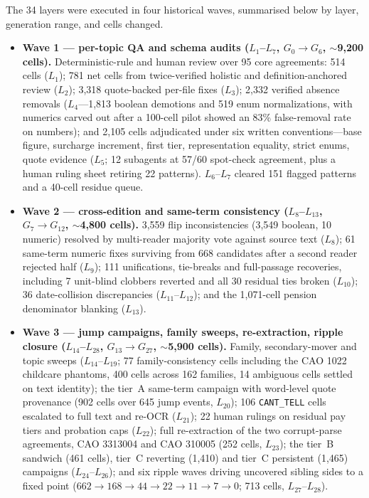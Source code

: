 The 34 layers were executed in four historical waves, summarised below by layer, generation range, and cells changed.
\begin{itemize}[leftmargin=1.5em]
  \item \textbf{Wave 1 --- per-topic QA and schema audits ($L_1$--$L_7$, $G_0 \rightarrow G_6$, $\sim$9,200 cells).} Deterministic-rule and human review over 95 core agreements: 514 cells ($L_1$); 781 net cells from twice-verified holistic and definition-anchored review ($L_2$); 3,318 quote-backed per-file fixes ($L_3$); 2,332 verified absence removals ($L_4$---1,813 boolean demotions and 519 enum normalizations, with numerics carved out after a 100-cell pilot showed an 83\% false-removal rate on numbers); and 2,105 cells adjudicated under six written conventions---base figure, surcharge increment, first tier, representation equality, strict enums, quote evidence ($L_5$; 12 subagents at 57/60 spot-check agreement, plus a human ruling sheet retiring 22 patterns). $L_6$--$L_7$ cleared 151 flagged patterns and a 40-cell residue queue.
  \item \textbf{Wave 2 --- cross-edition and same-term consistency ($L_8$--$L_{13}$, $G_7 \rightarrow G_{12}$, $\sim$4,800 cells).} 3,559 flip inconsistencies (3,549 boolean, 10 numeric) resolved by multi-reader majority vote against source text ($L_8$); 61 same-term numeric fixes surviving from 668 candidates after a second reader rejected half ($L_9$); 111 unifications, tie-breaks and full-passage recoveries, including 7 unit-blind clobbers reverted and all 30 residual ties broken ($L_{10}$); 36 date-collision discrepancies ($L_{11}$--$L_{12}$); and the 1,071-cell pension denominator blanking ($L_{13}$).
  \item \textbf{Wave 3 --- jump campaigns, family sweeps, re-extraction, ripple closure ($L_{14}$--$L_{28}$, $G_{13} \rightarrow G_{27}$, $\sim$5,900 cells).} Family, secondary-mover and topic sweeps ($L_{14}$--$L_{19}$; 77 family-consistency cells including the CAO 1022 childcare phantoms, 400 cells across 162 families, 14 ambiguous cells settled on text identity); the tier~A same-term campaign with word-level quote provenance (902 cells over 645 jump events, $L_{20}$); 106 \texttt{CANT\_TELL} cells escalated to full text and re-OCR ($L_{21}$); 22 human rulings on residual pay tiers and probation caps ($L_{22}$); full re-extraction of the two corrupt-parse agreements, CAO 3313004 and CAO 310005 (252 cells, $L_{23}$); the tier~B sandwich (461 cells), tier~C reverting (1,410) and tier~C persistent (1,465) campaigns ($L_{24}$--$L_{26}$); and six ripple waves driving uncovered sibling sides to a fixed point ($662 \rightarrow 168 \rightarrow 44 \rightarrow 22 \rightarrow 11 \rightarrow 7 \rightarrow 0$; 713 cells, $L_{27}$--$L_{28}$).

\end{itemize}

